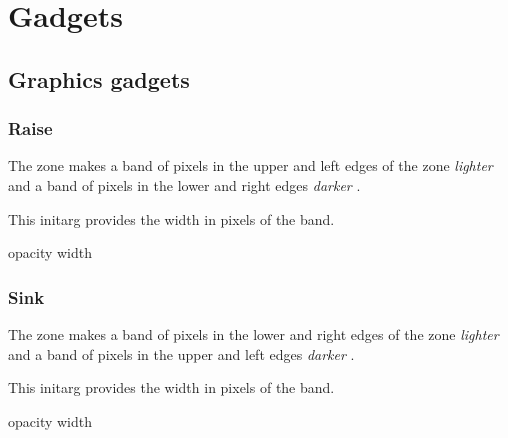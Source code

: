 \chapter{Gadgets}

\section{Graphics gadgets}

\subsection{Raise}

The  zone makes a band of pixels in the upper and left
edges of the zone \emph{lighter}  and
a band of pixels in the lower and right edges \emph{darker}
. 




This initarg provides the width in pixels of the band.

 {opacity width}

\subsection{Sink}

The  zone makes a band of pixels in the lower and right
edges of the zone \emph{lighter}  and
a band of pixels in the upper and left edges \emph{darker}
. 




This initarg provides the width in pixels of the band.

 {opacity width}

